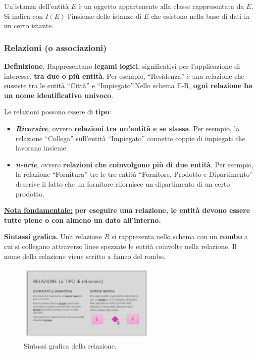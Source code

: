 \documentclass[a4paper]{article}
\newcommand{\dquotes}[1]{``#1''}
\begin{document}
	Un’istanza dell’entità $E$ è un oggetto appartenente alla classe rappresentata da $E$. Si indica con $I(E)$ l’insieme delle istanze di $E$ che esistono nella base di dati in un certo istante.
	
	\newpage
	
	
	
	
	\subsubsection{Relazioni (o associazioni)}\label{par: relazioni}
	
	\textcolor{Red3}{\textbf{Definizione.}} Rappresentano \textbf{legami logici}, significativi per l'applicazione di interesse, \textbf{tra due o più entità}. Per esempio, \dquotes{Residenza} è una relazione che sussiste tra le entità \dquotes{Città} e \dquotes{Impiegato}.Nello schema E-R, \textbf{ogni relazione ha un nome identificativo univoco}.
	
	\noindent
	Le relazioni possono essere di \textbf{tipo}:
	
	\begin{itemize}
		\item \textbf{\emph{Ricorsive}}, ovvero \textbf{relazioni tra un'entità e se stessa}. Per esempio, la relazione \dquotes{Collega} sull'entità \dquotes{Impiegato} connette coppie di impiegati che lavorano insieme.
		
		\item \textbf{\emph{n-arie}}, ovvero \textbf{relazioni che coinvolgono più di due entità}. Per esempio, la relazione \dquotes{Fornitura} tre le tre entità \dquotes{Fornitore, Prodotto e Dipartimento} descrive il fatto che un fornitore rifornisce un dipartimento di un certo prodotto.
	\end{itemize}

	\noindent
	\textbf{\underline{Nota fondamentale:}} \textbf{per eseguire una relazione, le entità devono essere tutte piene o con almeno un dato all'interno.} \newline
	
	\noindent
	\textcolor{Green4}{\textbf{Sintassi grafica.}} Una relazione $R$ si rappresenta nello schema con un \textbf{rombo} a cui si collegano attraverso linee spezzate le entità coinvolte nella relazione. Il nome della relazione viene scritto a fianco del rombo.
	
	\begin{figure}[!htp]
		\centering
		\includegraphics[width=0.6\textwidth]{img/relazione_def.pdf}
		\caption{Sintassi grafica della relazione.}
	\end{figure}
\end{document}
